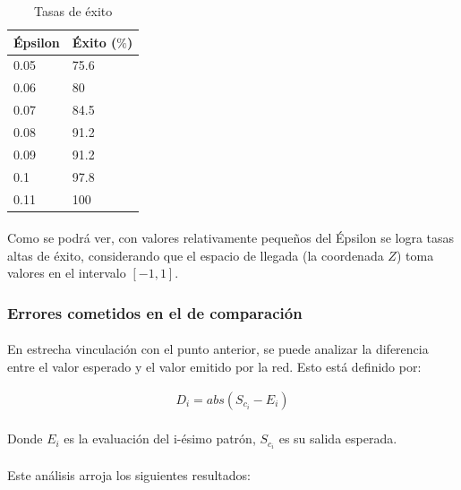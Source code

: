 \documentclass[12pt, twocolumn]{article}
\begin{document}
	\begin{table}[H]
		\centering
		\begin{tabular}{ll}
			\hline
			Épsilon & Éxito ($\%$)\\ \hline
			0.05     & 75.6  \\
			0.06     & 80    \\
			0.07     & 84.5  \\
			0.08     & 91.2  \\
			0.09     & 91.2  \\
			0.1      & 97.8  \\
			0.11     & 100   \\ \hline
			\end{tabular}
			\caption{Tasas de éxito}
			\label{ex1}
	\end{table}
	
	\paragraph{} Como se podrá ver, con valores relativamente pequeños del Épsilon se logra tasas altas de éxito, considerando que el espacio de llegada (la coordenada $Z$) toma valores en el intervalo $\left[-1, 1\right]$.
	
	\subsubsection{Errores cometidos en el  de comparación}
	
	\paragraph{} En estrecha vinculación con el punto anterior, se puede analizar la diferencia entre el valor esperado y el valor emitido por la red. Esto está definido por:
	
	\begin{align}
		D_{i} = abs(S_{c_{i}}-E_{i})
	\end{align}
	
	\paragraph{} Donde $E_{i}$ es la evaluación del i-ésimo patrón, $S_{c_{i}}$ es su salida esperada.
	
	\paragraph{} Este análisis arroja los siguientes resultados:
	
\end{document}
